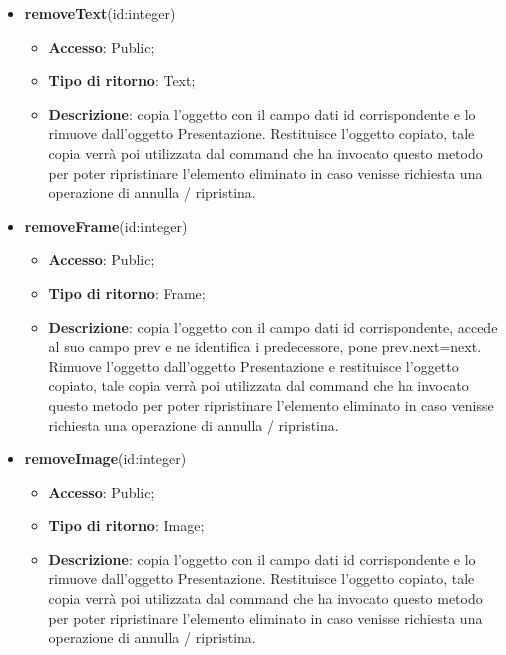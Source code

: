 {\begin{itemize}
\begin{itemize}
				\item \textbf{Descrizione}: costruisce un oggetto di tipo Background() passando il parametro spec e salvandosi in un oggetto oldBackground il background precedente. Imposta il nuovo background alla presentazione e ritorna oldBackground.
			\end{itemize}
			\item \textbf{removeText}(id:integer)
			\begin{itemize}
				\item \textbf{Accesso}: Public;
				\item \textbf{Tipo di ritorno}: Text;
				\item \textbf{Descrizione}: copia l’oggetto con il campo dati id corrispondente e lo rimuove dall’oggetto Presentazione. Restituisce l’oggetto copiato, tale copia verrà poi utilizzata dal command che ha invocato questo metodo per poter ripristinare l'elemento eliminato in caso venisse richiesta una operazione di annulla / ripristina.
			\end{itemize}
			\item \textbf{removeFrame}(id:integer)
			\begin{itemize}
				\item \textbf{Accesso}: Public;
				\item \textbf{Tipo di ritorno}: Frame;
				\item \textbf{Descrizione}: copia l’oggetto con il campo dati id corrispondente, accede al suo campo prev e ne identifica i predecessore, pone prev.next=next. Rimuove l’oggetto dall’oggetto Presentazione e restituisce l’oggetto copiato, tale copia verrà poi utilizzata dal command che ha invocato questo metodo per poter ripristinare l'elemento eliminato in caso venisse richiesta una operazione di annulla / ripristina.
			\end{itemize}
			\item \textbf{removeImage}(id:integer)
			\begin{itemize}
				\item \textbf{Accesso}: Public;
				\item \textbf{Tipo di ritorno}: Image;
				\item \textbf{Descrizione}: copia l’oggetto con il campo dati id corrispondente e lo rimuove dall’oggetto Presentazione. Restituisce l’oggetto copiato, tale copia verrà poi utilizzata dal command che ha invocato questo metodo per poter ripristinare l'elemento eliminato in caso venisse richiesta una operazione di annulla / ripristina.
			\end{itemize}

\end{itemize}}
